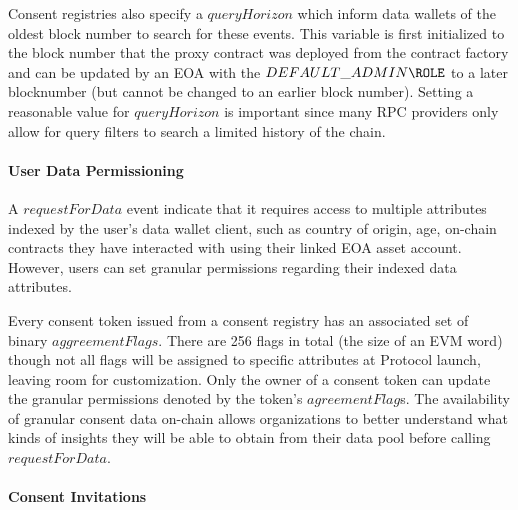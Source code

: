 Consent registries also specify a $queryHorizon$ which inform data wallets of the oldest block number to search for these events. This variable is 
first initialized to the block number that the proxy contract was deployed from the contract factory and can be updated by an EOA with the $DEFAULT\_ADMIN\ROLE$
to a later blocknumber (but cannot be changed to an earlier block number). Setting a reasonable value for $queryHorizon$ is important since many RPC providers
only allow for query filters to search a limited history of the chain.

\paragraph{User Data Permissioning}

A $requestForData$ event indicate that it requires access to multiple attributes indexed by the user's data wallet client, such as country of origin, age,
on-chain contracts they have interacted with using their linked EOA asset account. However, users can set granular permissions regarding their indexed data 
attributes. 

Every consent token issued from a consent registry has an associated set of binary $aggreementFlags$. There are 256 flags in total (the size of an EVM word) 
though not all flags will be assigned to specific attributes at Protocol launch, leaving room for customization. Only the owner of a consent token can 
update the granular permissions denoted by the token's $agreementFlag$s. The availability of granular consent data on-chain allows organizations to better 
understand what kinds of insights they will be able to obtain from their data pool before calling $requestForData$. 

\paragraph{Consent Invitations}
\label{section:ConsentInvitations}


